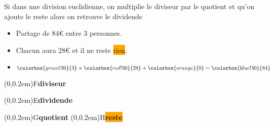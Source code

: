 \begin{propriete}[\admise]
	Si dans une division euclidienne, on multiplie le diviseur par le quotient et qu'on ajoute le reste
	alors on retrouve le dividende
\end{propriete}
\vfill
\begin{exemple*1}
	\phantom{rrr}

	\begin{minipage}{0.5\linewidth}
		\begin{itemize}
			\item Partage de 84\euro{} entre 3 personnes.
			\item Chacun aura \colorbox{red!30}{28}\euro{} et il ne reste \colorbox{orange}{rien}.
			\item $\colorbox{green!30}{3}\times \colorbox{red!30}{28}+ \colorbox{orange}{0}=\colorbox{blue!30}{84}$
		\end{itemize}
	\end{minipage}
	\begin{minipage}{0.5\linewidth}
		\begin{center}
			\qquad
			\begin{minipage}[b]{2cm}
				\pnode(0,0.2em){F}{\colorbox{green!30}{\textbf{diviseur}}}
				\par
				\pnode(0,0.2em){E}{\colorbox{blue!30}{\textbf{dividende}}}
				\par
				\pnode(0,0.2em){G}{\colorbox{red!30}{\textbf{quotient}}}
				\pnode(0,0.2em){H}{\colorbox{orange}{\textbf{reste}}}
			\end{minipage}
		\end{center}
	\end{minipage}	
\end{exemple*1}
\vfill
